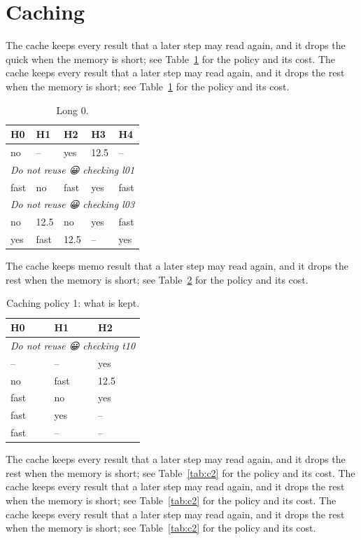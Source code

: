 \section{Caching}
The cache keeps every result that a later step may read again, and it drops the quick when the memory is short; see Table~\ref{tab:c0} for the policy and its cost. The cache keeps every result that a later step may read again, and it drops the rest when the memory is short; see Table~\ref{tab:c0} for the policy and its cost. 

\begin{longtable}{lllll}
\caption{Long 0.}\label{tab:c0}\\
\toprule
    \textbf{H0} & \textbf{H1} & \textbf{H2} & \textbf{H3} & \textbf{H4} \\
    \midrule
    no & -- & yes & 12.5 & -- \\
    \multicolumn{5}{l}{\emph{Do not reuse 😀 checking l01}} \\
    fast & no & fast & yes & fast \\
    \multicolumn{5}{l}{\emph{Do not reuse 😀 checking l03}} \\
    no & 12.5 & no & yes & fast \\
    yes & fast & 12.5 & -- & yes \\
    \bottomrule
\end{longtable}

The cache keeps memo result that a later step may read again, and it drops the rest when the memory is short; see Table~\ref{tab:c1} for the policy and its cost. 

\begin{table}[t]
  \centering
  \caption{Caching policy 1: what is kept.}\label{tab:c1}
  \begin{tabular}{lll}
    \toprule
    \textbf{H0} & \textbf{H1} & \textbf{H2} \\
    \midrule
    \multicolumn{3}{l}{\emph{Do not reuse 😀 checking t10}} \\
    -- & -- & yes \\
    no & fast & 12.5 \\
    fast & no & yes \\
    fast & yes & -- \\
    fast & -- & -- \\
    \bottomrule
  \end{tabular}
\end{table}

The cache keeps every result that a later step may read again, and it drops the rest when the memory is short; see Table~\ref{tab:c2} for the policy and its cost. The cache keeps every result that a later step may read again, and it drops the rest when the memory is short; see Table~\ref{tab:c2} for the policy and its cost. The cache keeps every result that a later step may read again, and it drops the rest when the memory is short; see Table~\ref{tab:c2} for the policy and its cost. 

